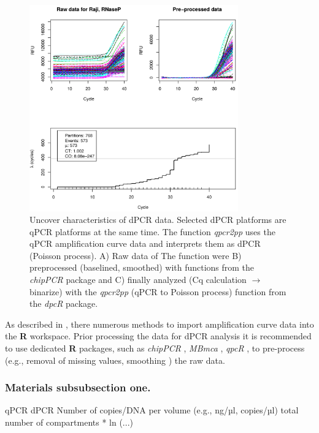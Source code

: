 \documentclass[a4,center,fleqn]{NAR}
\begin{document}
\begin{figure}[t]
\begin{center}
\includegraphics[width=9cm]{qpcr2pp_1.png}
\end{center}
\caption{Uncover characteristics of dPCR data. 
Selected dPCR platforms are qPCR platforms at the same time. The function \textit{qpcr2pp} uses the 
qPCR amplification curve data and interprets them as dPCR (Poisson process). A) Raw data of The 
function were B) preprocessed (baselined, smoothed) with functions from the 
\textit{chipPCR} package and C) finally analyzed (Cq calculation $\rightarrow$ binarize) with the 
\textit{qpcr2pp} (qPCR to Poisson process) function from the \textit{dpcR} package.} 
\label{qpcr2pp_1}
\end{figure}

As described in \cite{ritz_qpcr_2008, perkins_readqpcr_2012, 
pabinger_survey_2014, rodiger_r_2015}, there numerous methods to import 
amplification curve data into the \textbf{R} workspace. Prior processing the 
data for dPCR analysis it is recommended to use dedicated \textbf{R} packages, 
such as \textit{chipPCR} \cite{roediger2015chippcr}, \textit{MBmca} 
\cite{rodiger_surface_2013}, \textit{qpcR} \cite{ritz_qpcr_2008}, to 
pre-process (e.g., removal of missing values, smoothing 
\cite{spiess_impact_2015}) the raw data.

\subsubsection{Materials subsubsection one.}

qPCR	dPCR
Number of copies/DNA per volume (e.g., ng/µl, copies/µl)	total number of compartments * ln (...)
\end{document}
